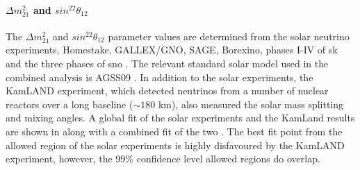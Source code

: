 \paragraph{$\Delta m^2_{21}$ and $sin^22\theta_{12}$}
The $\Delta m^2_{21}$ and $sin^22\theta_{12}$ parameter values are determined from the solar neutrino experiments, Homestake, GALLEX/GNO, SAGE, Borexino, phases I-IV of \gls{sk} and the three phases of \gls{sno} \cite{Measurement_of_the_Solar_Electron_Neutrino_Flux_with_the_Homestake_Chlorine_Detector}\cite{Gallex_reanalysis}\cite{Measurement_of_the_solar_neutrino_capture_rate_with_gallium_metal}\cite{Precision_measurement_of_the_7Be_solar_neutrino_interaction_rate_in_Borexino}\cite{Final_results_of_Borexino_PhaseI_on_low_energy_solar_neutrino_spectroscopy} \cite{Solar_neutrino_measurements_in_Super-Kamiokande-I}\cite{Solar_neutrino_measurements_in_Super-Kamiokande-II}\cite{Solar_neutrino_results_in_Super-Kamiokande-III}\cite{8B_solar_neutrino_spectrum_measurement_using_Super-Kamiokande_IV}\cite{Combined_Analysis_of_all_Three_Phases_of_Solar_Neutrino_Data_from_the_Sudbury_Neutrino_Observatory}. The relevant standard solar model used in the combined analysis is AGSS09 \cite{AGSS09}. In addition to the solar experiments, the KamLAND experiment, which detected neutrinos from a number of nuclear reactors over a long baseline ($\sim180$ km), also measured the solar mass splitting and mixing angles. \cite{Precision_Measurement_of_Neutrino_Oscillation_Parameters_with_KamLAND}\cite{Constraints_on_theta13_from_A_Three_Flavor_Oscillation_Analysis_of_Reactor_Antineutrinos_at_KamLAND}\cite{Reactor_On-Off_Antineutrino_Measurement_with_KamLAND} A global fit of the solar experiments and the KamLand results are shown in  along with a combined fit of the two \cite{2020_global_reassessment_of_the_neutrino_oscillation_picture}. The best fit point from the allowed region of the solar experiments is highly disfavoured by the KamLAND experiment, however, the 99\% confidence level allowed regions do overlap. 

